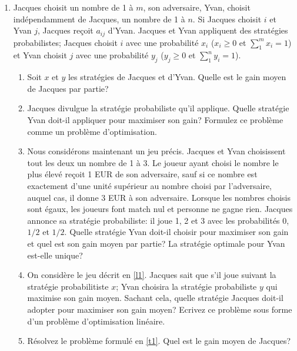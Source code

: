 \begin{enumerate}
  \item  Jacques choisit un nombre de 1 à $m$, son adversaire, Yvan, choisit indépendamment
    de Jacques, un nombre de 1 à $n$. Si Jacques choisit $i$ et Yvan $j$, Jacques reçoit
    $a_{ij}$ d'Yvan. Jacques et Yvan appliquent des stratégies probabilistes; Jacques
    choisit
    $i$ avec une probabilité
    $x_i$  ($x_i \geq 0$ et $\sum_1^m x_i =1$) et Yvan choisit $j$ avec une probabilité
    $y_j$ ($y_j \geq 0$ et $\sum_1^n y_i =1$).

    \begin{enumerate}
      \item Soit $x$ et $y$ les stratégies de Jacques et d'Yvan. Quelle est le gain moyen de
        Jacques par partie?
      \item Jacques divulgue la stratégie probabiliste qu'il applique. Quelle stratégie Yvan
        doit-il appliquer pour maximiser son gain? Formulez ce problème comme un problème
        d'optimisation.
      \item \label{l1} Nous considérons maintenant un jeu précis. Jacques et Yvan choisissent tout les deux un nombre
        de  1 à 3. Le joueur ayant choisi le nombre le plus élevé reçoit 1 EUR de son adversaire, sauf si ce
        nombre est exactement d'une unité supérieur au nombre choisi par l'adversaire, auquel cas,
        il donne 3 EUR à son adversaire. Lorsque les nombres choisis sont égaux, les joueurs font
        match nul et personne ne gagne rien. Jacques annonce sa stratégie probabiliste: il joue 1,
        2 et 3 avec les probabilités $0$,
        $1/2$ et $1/2$. Quelle stratégie Yvan doit-il choisir pour maximiser son gain et quel est
        son gain moyen par partie? La stratégie optimale pour Yvan est-elle unique?
      \item \label{t1} On considère le jeu décrit en \ref{l1}. Jacques sait que s'il joue suivant la stratégie
        probabilitiste
        $x$; Yvan choisira la stratégie probabiliste $y$ qui maximise son gain moyen. Sachant cela, quelle stratégie
        Jacques doit-il adopter pour maximiser son gain moyen? Ecrivez ce
        problème sous forme d'un problème d'optimisation linéaire.

      \item Résolvez le problème formulé en \ref{t1}. Quel est le gain moyen de Jacques?

    \end{enumerate}



    \begin{solution}
      \nosolution
    \end{solution}


\end{enumerate}
